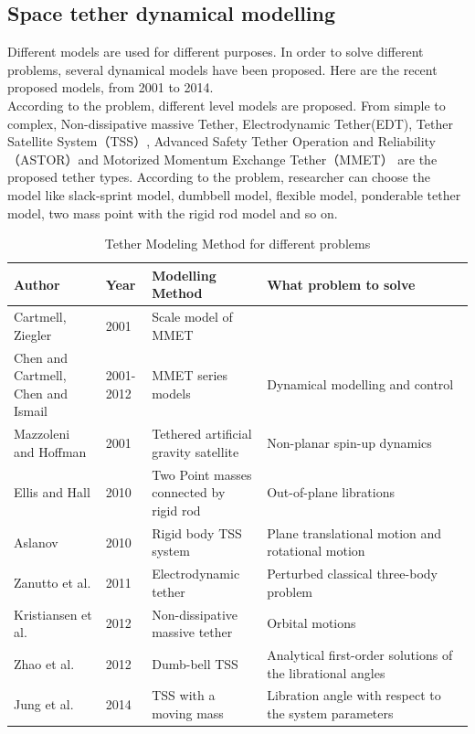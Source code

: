 \subsection{Space tether dynamical modelling}

Different models are used for different purposes. In order to solve different problems, several dynamical models have been proposed. Here are the recent proposed models, from 2001 to 2014.\\

According to the problem, different level models are proposed. From simple to complex, Non-dissipative massive Tether, Electrodynamic Tether(EDT), Tether Satellite System（TSS）, Advanced Safety Tether Operation and Reliability（ASTOR）and Motorized Momentum Exchange Tether（MMET） are the proposed tether types. According to the problem, researcher can choose the model like slack-sprint model, dumbbell model, flexible model, ponderable tether model, two mass point with the rigid rod model and so on.




\begin{table}[h!]
\renewcommand\arraystretch{2}
	\begin{center}
	\caption{Tether Modeling Method for different problems}
	\begin{tabular}{p{0.2\linewidth}|p{0.1\linewidth}|p{0.25\linewidth}|p{0.45\linewidth}}
	\toprule
	\textbf{Author} & \textbf{Year} & \textbf{Modelling Method} & \textbf{What problem to solve}\\
	\midrule
	Cartmell, Ziegler & 2001 & Scale model of MMET & \\
	Chen and Cartmell, Chen and Ismail & 2001-2012 & MMET series models & Dynamical modelling and control\\
	Mazzoleni and Hoffman & 2001 & Tethered artificial gravity satellite & Non-planar spin-up dynamics\\
	Ellis and Hall&	2010&	Two Point masses connected by rigid rod & Out-of-plane librations\\
	Aslanov &	2010&	Rigid body TSS system	& Plane translational motion and rotational motion\\
	Zanutto et al.& 2011 & Electrodynamic tether & Perturbed classical three-body problem\\
	Kristiansen et al.&	2012 &	Non-dissipative massive tether & Orbital motions\\
	Zhao et al.	&2012&	Dumb-bell TSS & Analytical first-order solutions of the librational angles\\
	Jung et al. & 2014 &	TSS with a moving mass & Libration angle with respect to the system parameters\\
	\bottomrule
	\end{tabular}	
	\end{center}
\end{table}



\newpage
